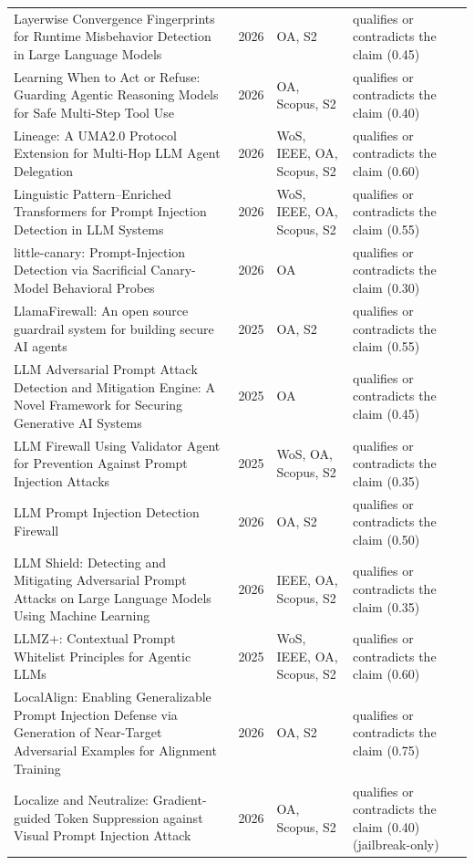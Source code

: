 \begin{longtable}{@{}%
  >{\raggedright\arraybackslash}p{}c%
  >{\raggedright\arraybackslash}p{}%
  >{\raggedright\arraybackslash}p{}@{}}
Layerwise Convergence Fingerprints for Runtime Misbehavior Detection in Large Language Models & 2026 & OA, S2 & qualifies or contradicts the claim (0.45) \\
Learning When to Act or Refuse: Guarding Agentic Reasoning Models for Safe Multi-Step Tool Use & 2026 & OA, Scopus, S2 & qualifies or contradicts the claim (0.40) \\
Lineage: A UMA2.0 Protocol Extension for Multi-Hop LLM Agent Delegation & 2026 & WoS, IEEE, OA, Scopus, S2 & qualifies or contradicts the claim (0.60) \\
Linguistic Pattern--Enriched Transformers for Prompt Injection Detection in LLM Systems & 2026 & WoS, IEEE, OA, Scopus, S2 & qualifies or contradicts the claim (0.55) \\
little-canary: Prompt-Injection Detection via Sacrificial Canary-Model Behavioral Probes & 2026 & OA & qualifies or contradicts the claim (0.30) \\
LlamaFirewall: An open source guardrail system for building secure AI agents & 2025 & OA, S2 & qualifies or contradicts the claim (0.55) \\
LLM Adversarial Prompt Attack Detection and Mitigation Engine: A Novel Framework for Securing Generative AI Systems & 2025 & OA & qualifies or contradicts the claim (0.45) \\
LLM Firewall Using Validator Agent for Prevention Against Prompt Injection Attacks & 2025 & WoS, OA, Scopus, S2 & qualifies or contradicts the claim (0.35) \\
LLM Prompt Injection Detection Firewall & 2026 & OA, S2 & qualifies or contradicts the claim (0.50) \\
LLM Shield: Detecting and Mitigating Adversarial Prompt Attacks on Large Language Models Using Machine Learning & 2026 & IEEE, OA, Scopus, S2 & qualifies or contradicts the claim (0.35) \\
LLMZ+: Contextual Prompt Whitelist Principles for Agentic LLMs & 2025 & WoS, IEEE, OA, Scopus, S2 & qualifies or contradicts the claim (0.60) \\
LocalAlign: Enabling Generalizable Prompt Injection Defense via Generation of Near-Target Adversarial Examples for Alignment Training & 2026 & OA, S2 & qualifies or contradicts the claim (0.75) \\
Localize and Neutralize: Gradient-guided Token Suppression against Visual Prompt Injection Attack & 2026 & OA, Scopus, S2 & qualifies or contradicts the claim (0.40) (jailbreak-only) \\

\end{longtable}
